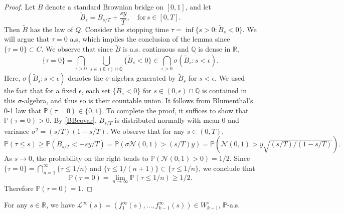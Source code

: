 \begin{proof}
	Let $B$ denote a standard Brownian bridge on $[0,1]$, and let 
	\[
	\tilde{B}_s = B_{s/T} + \frac{sy}{T}, \quad \mathrm{for}\,s\in[0,T].
	\]
	Then $\tilde{B}$ has the law of $Q$. Consider the stopping time $\tau = \inf\{s>0 : \tilde{B}_s < 0 \}$. We will argue that $\tau = 0$ a.s, which implies the conclusion of the lemma since $\{\tau = 0\} \subset C$. We observe that since $\tilde{B}$ is a.s. continuous and $\mathbb{Q}$ is dense in $\mathbb{R}$,
	\[
	\{\tau = 0\} = \bigcap_{\epsilon > 0}\,\bigcup_{s\in(0,\epsilon)\cap\mathbb{Q}} \{\tilde{B}_s < 0 \} \in \bigcap_{\epsilon > 0} \sigma(\tilde{B}_s : s<\epsilon).
	\]
	Here, $\sigma(\tilde{B}_s : s<\epsilon)$ denotes the $\sigma$-algebra generated by $\tilde{B}_s$ for $s<\epsilon$. We used the fact that for a fixed $\epsilon$, each set $\{\tilde{B}_s < 0\}$ for $s\in (0,\epsilon)\cap\mathbb{Q}$ is contained in this $\sigma$-algebra, and thus so is their countable union. It follows from Blumenthal's 0-1 law \cite[Theorem 7.2.3]{Durrett} that $\mathbb{P}(\tau = 0) \in \{0,1\}$. To complete the proof, it suffices to show that $\mathbb{P}(\tau = 0) > 0$. By \eqref{BBcovar}, $B_{s/T}$ is distributed normally with mean 0 and variance $\sigma^2 = (s/T)(1-s/T)$. We observe that for any $s\in(0,T)$, 
	\[
	\mathbb{P}(\tau\leq s) \geq \mathbb{P}(B_{s/T} < -sy/T) = \mathbb{P}\left(\sigma\mathcal{N}(0,1) > (s/T)y\right) = \mathbb{P}\left(\mathcal{N}(0,1) > y\sqrt{(s/T)/(1-s/T)}\right).
	\]
	As $s\to 0$, the probability on the right tends to $\mathbb{P}(\mathcal{N}(0,1) > 0) = 1/2$. Since $\{\tau = 0\} = \bigcap_{n=1}^\infty \{\tau \leq 1/n\}$ and $\{\tau\leq 1/(n+1)\} \subset \{\tau \leq 1/n\}$, we conclude that
	\[
	\mathbb{P}(\tau = 0) = \lim_{n\to\infty} \mathbb{P}(\tau \leq 1/n) \geq 1/2.
	\]
	Therefore $\mathbb{P}(\tau = 0) = 1$.
	
\end{proof}	

\begin{lemma}\label{inftydistinct}
	For any $s\in\mathbb{R}$, we have $\mathcal{L}^\infty(s) = (f_1^\infty(s),\dots,f_{k-1}^\infty(s)) \in W^\circ_{k-1}$, $\mathbb{P}$-a.s.
\end{lemma}

